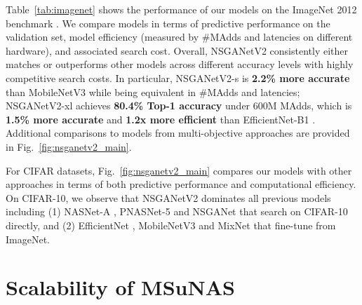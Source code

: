 \documentclass[runningheads]{llncs}
\def\ourmethod{MSuNAS}
\def\ourmodel{NSGANetV2}
\begin{document}
Table~\ref{tab:imagenet} shows the performance of our models on the ImageNet 2012 benchmark \cite{imagenet}. We compare models in terms of predictive performance on the validation set, model efficiency (measured by \#MAdds and latencies on different hardware), and associated search cost. Overall, \ourmodel{} consistently either matches or outperforms other models across different accuracy levels with highly competitive search costs. In particular, \ourmodel{}-s is \textbf{2.2\% more accurate} than MobileNetV3 \cite{mobilenetv3} while being equivalent in \#MAdds and latencies; \ourmodel{}-xl achieves \textbf{80.4\% Top-1 accuracy} under 600M MAdds, which is \textbf{1.5\% more accurate} and \textbf{1.2x more efficient} than EfficientNet-B1 \cite{efficientnet}. Additional comparisons to models from multi-objective approaches are provided in Fig.~\ref{fig:nsganetv2_main}.

For CIFAR datasets, Fig.~\ref{fig:nsganetv2_main} compares our models with other approaches in terms of both predictive performance and computational efficiency. On CIFAR-10, we observe that \ourmodel{} dominates all previous models including (1) NASNet-A \cite{nasnet}, PNASNet-5 \cite{PNAS} and NSGANet \cite{NSGANet} that search on CIFAR-10 directly, and (2) EfficientNet \cite{efficientnet}, MobileNetV3 \cite{mobilenetv3} and MixNet \cite{mixnet} that fine-tune from ImageNet.
 \section{Scalability of \ourmethod{}}
\end{document}
